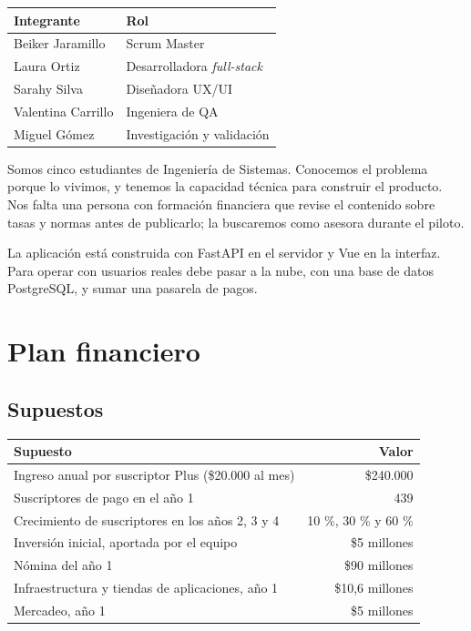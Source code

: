 \documentclass[11pt,a4paper]{article}
\begin{document}
\begin{tabularx}{\textwidth}{l X}
  \toprule
  \textbf{Integrante} & \textbf{Rol} \\
  \midrule
  Beiker Jaramillo & Scrum Master \\
  Laura Ortiz & Desarrolladora \textit{full-stack} \\
  Sarahy Silva & Diseñadora UX/UI \\
  Valentina Carrillo & Ingeniera de QA \\
  Miguel Gómez & Investigación y validación \\
  \bottomrule
\end{tabularx}

Somos cinco estudiantes de Ingeniería de Sistemas. Conocemos el problema porque lo vivimos, y tenemos la capacidad técnica para construir el producto. Nos falta una persona con formación financiera que revise el contenido sobre tasas y normas antes de publicarlo; la buscaremos como asesora durante el piloto.

La aplicación está construida con FastAPI en el servidor y Vue en la interfaz. Para operar con usuarios reales debe pasar a la nube, con una base de datos PostgreSQL, y sumar una pasarela de pagos.

\section{Plan financiero}

\subsection{Supuestos}

\begin{tabularx}{\textwidth}{X r}
  \toprule
  \textbf{Supuesto} & \textbf{Valor} \\
  \midrule
  Ingreso anual por suscriptor Plus (\$20.000 al mes) & \$240.000 \\
  Suscriptores de pago en el año 1 & 439 \\
  Crecimiento de suscriptores en los años 2, 3 y 4 & 10 \%, 30 \% y 60 \% \\
  Inversión inicial, aportada por el equipo & \$5 millones \\
  Nómina del año 1 & \$90 millones \\
  Infraestructura y tiendas de aplicaciones, año 1 & \$10,6 millones \\
  Mercadeo, año 1 & \$5 millones \\
  \bottomrule
\end{tabularx}
\end{document}
